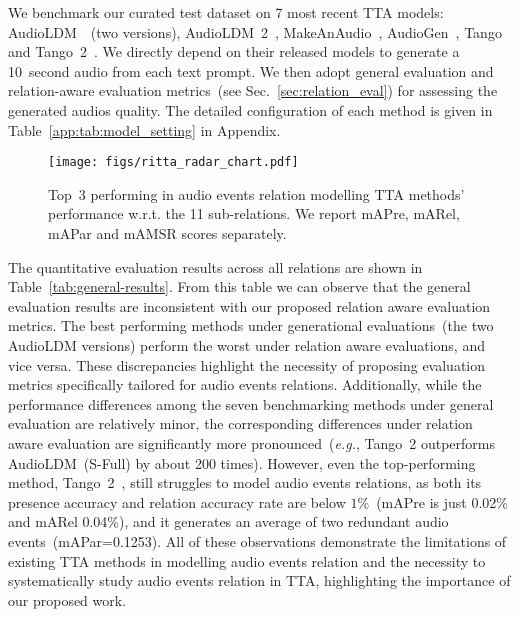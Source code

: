 We benchmark our curated test dataset on 7 most recent TTA models: AudioLDM~\citep{liu2023audioldm}~(two versions), AudioLDM~2~\citep{audioldm2}, MakeAnAudio~\citep{makeanaudio}, AudioGen~\citep{kreuk2022audiogen}, Tango~\citep{ghosal2023tango} and Tango~2~\citep{ghosal2023tango2}. We directly depend on their released models to generate a 10~second audio from each text prompt. We then adopt general evaluation and relation-aware evaluation metrics~(see Sec.~\ref{sec:relation_eval}) for assessing the generated audios quality. The detailed configuration of each method is given in Table~\ref{app:tab:model_setting} in Appendix. 

\begin{figure}[t]
    \centering
    \texttt{[image: figs/ritta\_radar\_chart.pdf]}
    \caption{\small Top~3 performing in audio events relation modelling TTA methods' performance w.r.t. the 11 sub-relations. We report mAPre, mARel, mAPar and mAMSR scores separately.}
    \label{fig:exp_radar_chart}
\end{figure}

The quantitative evaluation results across all relations are shown in Table~\ref{tab:general-results}. From this table we can observe that the general evaluation results are inconsistent with our proposed relation aware evaluation metrics. The best performing methods under generational evaluations~(the two AudioLDM versions) perform the worst under relation aware evaluations, and vice versa. These discrepancies highlight the necessity of proposing evaluation metrics specifically tailored for audio events relations. Additionally, while the performance differences among the seven benchmarking methods under general evaluation are relatively minor, the corresponding differences under relation aware evaluation are significantly more pronounced~(\textit{e.g.}, Tango~2 outperforms AudioLDM~(S-Full) by about 200 times). However, even the top-performing method, Tango~2~\citep{ghosal2023tango2}, still struggles to model audio events relations, as both its presence accuracy and relation accuracy rate are below $1\%$~(mAPre is just 0.02\% and mARel 0.04\%), and it generates an average of two redundant audio events~(mAPar=0.1253). All of these observations demonstrate the limitations of existing TTA methods in modelling audio events relation and the necessity to systematically study audio events relation in TTA, highlighting the importance of our proposed work.

